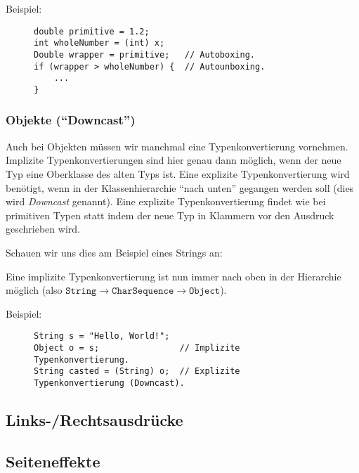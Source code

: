 			Beispiel:
			\begin{figure}[H]
				\centering
				\begin{lstlisting}
double primitive = 1.2;
int wholeNumber = (int) x;
Double wrapper = primitive;   // Autoboxing.
if (wrapper > wholeNumber) {  // Autounboxing.
	...
}
\end{lstlisting}
			\end{figure}
		
	
	\subsubsection{Objekte (\enquote{Downcast})}
		\label{sec:downcast}
	
		Auch bei Objekten müssen wir manchmal eine Typenkonvertierung vornehmen. Implizite Typenkonvertierungen sind hier genau dann möglich, wenn der neue Typ eine Oberklasse des alten Typs ist. Eine explizite Typenkonvertierung wird benötigt, wenn in der Klassenhierarchie \enquote{nach unten} gegangen werden soll (dies wird \textit{Downcast} genannt). Eine explizite Typenkonvertierung findet wie bei primitiven Typen statt indem der neue Typ in Klammern vor den Ausdruck geschrieben wird.
		
		Schauen wir uns dies am Beispiel eines Strings an:
		\begin{figure}[H]
			\centering
		\end{figure}
		Eine implizite Typenkonvertierung ist nun immer nach oben in der Hierarchie möglich (also \( \texttt{String} \rightarrow \texttt{CharSequence} \rightarrow \texttt{Object} \)).
		
		Beispiel:
		\begin{figure}[H]
			\centering
			\begin{lstlisting}
String s = "Hello, World!";
Object o = s;                // Implizite Typenkonvertierung.
String casted = (String) o;  // Explizite Typenkonvertierung (Downcast).
\end{lstlisting}
		\end{figure}

\subsection{Links-/Rechtsausdrücke}

\subsection{Seiteneffekte}
